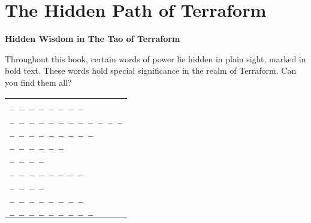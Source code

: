 \chapter*{The Hidden Path of Terraform}

\begin{center}
\large{\textbf{Hidden Wisdom in The Tao of Terraform}}
\end{center}


\noindent Throughout this book, certain words of power lie hidden in plain sight, marked in bold text. These words hold special significance in the realm of Terraform. Can you find them all?


\begin{center}
\begin{tabular}{l}
\texttt{\large{\_  \_  \_  \_  \_  \_  \_  \_}} \\[0.3cm]
\texttt{\large{\_  \_  \_  \_  \_  \_  \_  \_  \_  \_  \_  \_}} \\[0.3cm]
\texttt{\large{\_  \_  \_  \_  \_  \_  \_  \_  \_}} \\[0.3cm]
\texttt{\large{\_  \_  \_  \_  \_  \_}} \\[0.3cm]
\texttt{\large{\_  \_  \_  \_}} \\[0.3cm]
\texttt{\large{\_  \_  \_  \_  \_  \_  \_  \_}} \\[0.3cm]
\texttt{\large{\_  \_  \_  \_}} \\[0.3cm]
\texttt{\large{\_  \_  \_  \_  \_  \_  \_  \_}} \\[0.3cm]
\texttt{\large{\_  \_  \_  \_  \_  \_  \_  \_  \_}} \\[0.3cm]


\end{tabular}
\end{center}


\noindent{}


